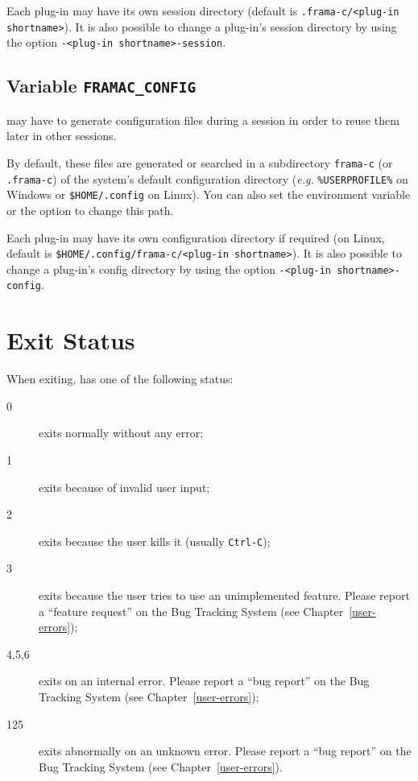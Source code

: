 Each \FramaC plug-in may have its own session directory (default is
\texttt{.frama-c/<plug-in shortname>}). It is also possible to change
a plug-in's session directory by using the option \texttt{-<plug-in
  shortname>-session}.

\subsection{Variable \texttt{FRAMAC\_CONFIG}}\label{sec:var-config}

\FramaC may have to generate configuration files during a session in order to
reuse them later in other sessions.

By default, these files are generated or searched in a subdirectory
\texttt{frama-c} (or \texttt{.frama-c}) of the system's default configuration
directory ({\it e.g.}
\texttt{\%USERPROFILE\%} on Windows or \texttt{\$HOME/.config}
on Linux). You can also set the environment variable 
or the option  to change this path.

Each \FramaC plug-in may have its own configuration directory if required (on
Linux, default is \texttt{\$HOME/.config/frama-c/<plug-in shortname>}). It is
also possible to change a plug-in's config directory by using the option
\texttt{-<plug-in shortname>-config}.

\section{Exit Status}

When exiting, \FramaC has one of the following status:
\begin{description}
\item[0] \FramaC exits normally without any error;
\item[1] \FramaC exits because of invalid user input;
\item[2] \FramaC exits because the user kills it (usually \via \texttt{Ctrl-C});
\item[3] \FramaC exits because the user tries to use an unimplemented feature.
  Please report a ``feature request'' on the Bug Tracking System (see
  Chapter~\ref{user-errors});
\item[4,5,6] \FramaC exits on an internal error. Please report a ``bug report'' on
  the Bug Tracking System (see Chapter~\ref{user-errors});
\item[125] \FramaC exits abnormally on an unknown error. Please report a ``bug
  report'' on the Bug Tracking System (see Chapter~\ref{user-errors}).
\end{description}

